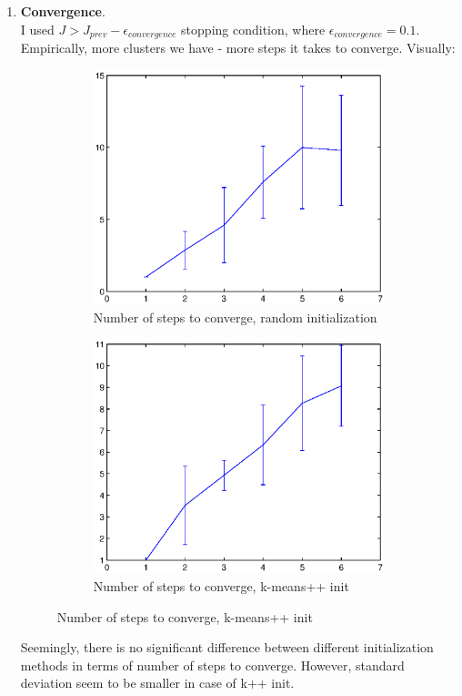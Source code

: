 \documentclass{article}
\begin{document}
\begin{enumerate}
		\pagebreak
		\item \textbf{Convergence}. \\
		I used $J > J_{prev} - \epsilon_{convergence}$ stopping condition, where $\epsilon_{convergence} = 0.1$.\\
		Empirically, more clusters we have - more steps it takes to converge. Visually:
		\begin{figure}[h]
			\centering
			\begin{subfigure}{.6\textwidth}
				\includegraphics[width=.9\linewidth]{convergence_random_init_15runs.eps}
				\caption{Number of steps to converge, random initialization}
				\label{fig:sub1}
			\end{subfigure}%
			\begin{subfigure}{.6\textwidth}
				\includegraphics[width=.9\linewidth]{convergence_smart_init_15runs.eps}
				\caption{Number of steps to converge, k-means++ init}
				\label{fig:sub1}
			\end{subfigure}
		\end{figure}
		Seemingly, there is no significant difference between different initialization methods in terms of number of steps to converge. However, standard deviation seem to be smaller in case of k++ init. 
		

\end{enumerate}
\end{document}
